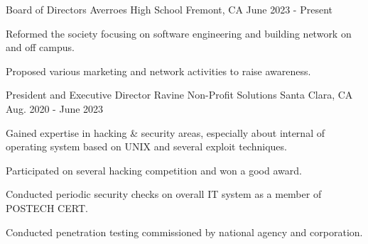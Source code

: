 

\begin{cventries}

  \cventry
    {Board of Directors} %
    {Averroes High School} %
    {Fremont, CA} %
    {June 2023 - Present} %
    {
      \begin{cvitems} %
        \item {Reformed the society focusing on software engineering and building network on and off campus.}
        \item {Proposed various marketing and network activities to raise awareness.}
      \end{cvitems}
    }

  \cventry
    {President and Executive Director} %
    {Ravine Non-Profit Solutions} %
    {Santa Clara, CA} %
    {Aug. 2020 - June 2023} %
    {
      \begin{cvitems} %
        \item {Gained expertise in hacking \& security areas, especially about internal of operating system based on UNIX and several exploit techniques.}
        \item {Participated on several hacking competition and won a good award.}
        \item {Conducted periodic security checks on overall IT system as a member of POSTECH CERT.}
        \item {Conducted penetration testing commissioned by national agency and corporation.}
      \end{cvitems}
    }

\end{cventries}

